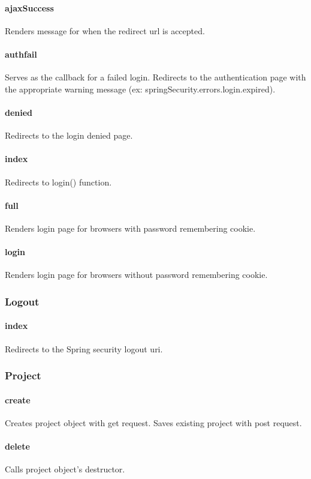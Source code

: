 \documentclass[12pt]{article}
\begin{document}
\paragraph{ajaxSuccess} Renders message for when the redirect url is accepted.
\paragraph{authfail} Serves as the callback for a failed login. Redirects to the authentication page with the appropriate warning message (ex: springSecurity.errors.login.expired).
\paragraph{denied} Redirects to the login denied page.
\paragraph{index} Redirects to login() function.
\paragraph{full} Renders login page for browsers with password remembering cookie.
\paragraph{login} Renders login page for browsers without password remembering cookie.

\subsubsection{Logout}\label{sec:CLogout}
\paragraph{index} Redirects to the Spring security logout uri.

\subsubsection{Project}\label{sec:CProject}
\paragraph{create} Creates project object with get request. Saves existing project with post request.
\paragraph{delete} Calls project object's destructor.
\end{document}
